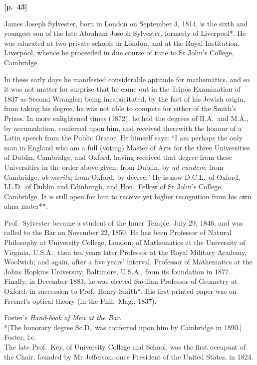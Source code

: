 \documentclass[11pt,a4paper]{book}
\begin{document}
\vspace{0.5em}
\noindent\textbf{[p.\ 43]}

James Joseph Sylvester, born in London on September 3, 1814, is the sixth and youngest son of the late Abraham Joseph Sylvester, formerly of Liverpool*. He was educated at two private schools in London, and at the Royal Institution, Liverpool, whence he proceeded in due course of time to St John's College, Cambridge.

In these early days he manifested considerable aptitude for mathematics, and so it was not matter for surprise that he came out in the Tripos Examination of 1837 as Second Wrangler; being incapacitated, by the fact of his Jewish origin, from taking his degree, he was not able to compete for either of the Smith's Prizes. In more enlightened times (1872), he had the degrees of B.A.\ and M.A., by accumulation, conferred upon him, and received therewith the honour of a Latin speech from the Public Orator. He himself says: ``I am perhaps the only man in England who am a full (voting) Master of Arts for the three Universities of Dublin, Cambridge, and Oxford, having received that degree from these Universities in the order above given: from Dublin, by \textit{ad eundem}; from Cambridge, \textit{ob merita}; from Oxford, by decree.'' He is now D.C.L.\ of Oxford, LL.D.\ of Dublin and Edinburgh, and Hon.\ Fellow of St John's College, Cambridge. It is still open for him to receive yet higher recognition from his own alma mater**.

Prof.\ Sylvester became a student of the Inner Temple, July 29, 1846, and was called to the Bar on November 22, 1850\dag. He has been Professor of Natural Philosophy at University College, London; of Mathematics at the University of Virginia, U.S.A.\ddag; then ten years later Professor at the Royal Military Academy, Woolwich; and again, after a five years' interval, Professor of Mathematics at the Johns Hopkins University, Baltimore, U.S.A., from its foundation in 1877. Finally, in December 1883, he was elected Savilian Professor of Geometry at Oxford, in succession to Prof.\ Henry Smith*. His first printed paper was on Fresnel's optical theory (in the Phil.\ Mag., 1837).

\vspace{0.3em}
\noindent * Foster's \textit{Hand-book of Men at the Bar}.\\
\noindent **[The honorary degree Sc.D.\ was conferred upon him by Cambridge in 1890.]\\
\noindent \dag Foster, l.c.\\
\noindent \ddag The late Prof.\ Key, of University College and School, was the first occupant of the Chair, founded by Mr Jefferson, once President of the United States, in 1824.
\end{document}
